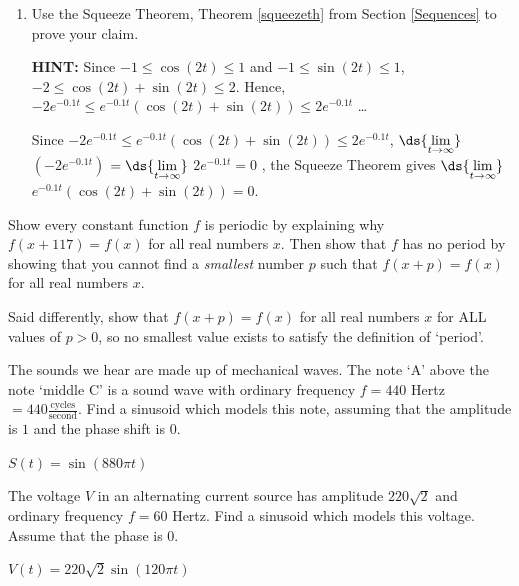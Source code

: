 \documentclass{ximera}
\begin{document}
\begin{question}
\begin{problem}
\begin{enumerate}
\item  Use the Squeeze Theorem, Theorem \ref{squeezeth} from Section \ref{Sequences} to prove your claim.  

\textbf{HINT:}  Since $-1 \leq \cos(2t) \leq 1$ and $-1 \leq \sin(2t) \leq 1$, $-2 \leq \cos(2t) + \sin(2t) \leq 2$.  Hence, $-2 e^{-0.1t} \leq e^{-0.1t} \left( \cos(2t) + \sin(2t)\right) \leq 2e^{-0.1t}$ \ldots

\begin{solution}
    Since   $-2 e^{-0.1t}  \leq e^{-0.1t} \left( \cos(2t) + \sin(2t)\right) \leq 2 e^{-0.1t}$,   $\ds{\lim_{t \rightarrow \infty}}$  $\left(- 2 e^{-0.1t}\right)$ $ = \ds{\lim_{t \rightarrow \infty}}$ $2 e^{-0.1t}=0$ , the Squeeze Theorem gives  $\ds{\lim_{t \rightarrow \infty}}$ $ e^{-0.1t} \left( \cos(2t) + \sin(2t)\right) = 0$.
\end{solution}

\end{enumerate}

\end{problem}

\end{question}

\begin{problem}
Show every constant function $f$ is periodic by explaining why $f(x + 117) = f(x)$ for all real numbers $x$. Then show that $f$ has no period by showing that you cannot find a \emph{smallest} number $p$ such that $f(x + p) = f(x)$ for all real numbers $x$.  


Said differently, show that $f(x + p) = f(x)$ for all real numbers $x$ for ALL values of $p > 0$, so no smallest value exists to satisfy the definition of `period'.

\end{problem}

\begin{problem}
The sounds we hear are made up of mechanical waves.  The note `A' above the note `middle C' is a sound wave with ordinary frequency $f = 440$ Hertz $= 440 \frac{\text{cycles}}{\text{second}}$.  Find a sinusoid which models this note, assuming that the amplitude is $1$ and the phase shift is $0$.

\begin{solution}
     $S(t) = \sin\left(880\pi t\right)$
\end{solution}
\end{problem}

\begin{problem}
The voltage $V$ in an alternating current source has amplitude $220 \sqrt{2}$ and ordinary frequency $f = 60$ Hertz.  Find a sinusoid which models this voltage.  Assume that the phase is $0$.

\begin{solution}
    $V(t) = 220 \sqrt{2} \sin\left(120\pi t\right)$
\end{solution}
\end{problem}
\end{document}
